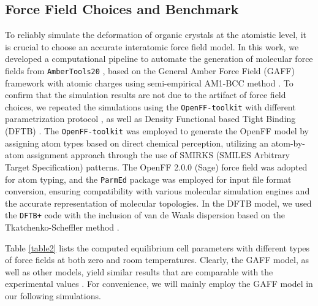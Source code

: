 \documentclass[prb,superscriptaddress,longbibliography, twocolumn]{revtex4-1}
\begin{document}
\subsection{Force Field Choices and Benchmark}
To reliably simulate the deformation of organic crystals at the atomistic level, it is crucial to choose an accurate interatomic force field model. In this work, we developed a computational pipeline to automate the generation of molecular force fields from \texttt{AmberTools20} \cite{Case2020a}, based on the General Amber Force Field (GAFF) \cite{gaff} framework with atomic charges using semi-empirical AM1-BCC method \cite{jakalian2000fast}. To confirm that the simulation results are not due to the artifact of force field choices, we repeated the simulations using the \texttt{OpenFF-toolkit} \cite{jeff_wagner_2023_7506404} with different parametrization protocol \cite{openff2.0.0, parmed}, as well as Density Functional based Tight Binding (DFTB) \cite{dftb+}. The \texttt{OpenFF-toolkit}\cite{jeff_wagner_2023_7506404} was employed to generate the OpenFF model by assigning atom types based on direct chemical perception, utilizing an atom-by-atom assignment approach through the use of SMIRKS (SMILES Arbitrary Target Specification) patterns. The OpenFF 2.0.0 (Sage) force field \cite{openff2.0.0} was adopted for atom typing, and the \texttt{ParmEd} package \cite{parmed} was employed for input file format conversion, ensuring compatibility with various molecular simulation engines and the accurate representation of molecular topologies. In the DFTB model, we used the \texttt{DFTB+} code \cite{dftb+} with the inclusion of van de Waals dispersion based on the Tkatchenko-Scheffler method \cite{TS-PRL}. 

Table \ref{table2} lists the computed equilibrium cell parameters with different types of force fields at both zero and room temperatures. Clearly, the GAFF model, as well as other models, yield similar results that are comparable with the experimental values \cite{devarapalli2019remarkably}. For convenience, we will mainly employ the GAFF model in our following simulations. 
\end{document}
